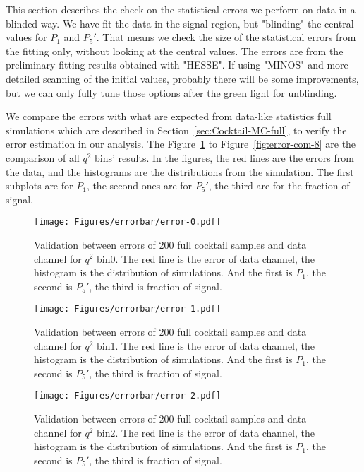 This section describes the check on the statistical errors we perform
on data in a blinded way. We have fit the data in the signal region,
but "blinding" the central values for $P_1$ and $P_5'$. That means we
check the size of the statistical errors from the fitting only,
without looking at the
central values.  The errors are from the preliminary
fitting results obtained with "HESSE".  If using "MINOS" and more
detailed scanning of the initial values, probably there will be some
improvements, but we can only fully tune those options after the green
light for unblinding.

We compare the errors with what are expected from data-like statistics
full simulations which are described in
Section~\ref{sec:Cocktail-MC-full}, to verify the error estimation in
our analysis. The Figure~\ref{fig:error-com-0} to
Figure~\ref{fig:error-com-8} are the comparison of all $q^2$ bins'
results. In the figures, the red lines are the errors from the data,
and the histograms are the distributions from the simulation. The
first subplots are for $P_1$, the second ones are for $P_5'$, the
third are for the fraction of signal.


\begin{figure}[!hbt]
  \centering
  \texttt{[image: Figures/errorbar/error-0.pdf]}
  \caption{Validation between errors of 200 full cocktail samples and
    data channel for $q^2$ bin0. The red line is the error of data
    channel, the histogram is the distribution of simulations. And the
    first is $P_1$, the second is $P_5'$, the third is fraction of
    signal.}
  \label{fig:error-com-0}
\end{figure}

\begin{figure}[!hbt]
  \centering
  \texttt{[image: Figures/errorbar/error-1.pdf]}
  \caption{Validation between errors of 200 full cocktail samples and
    data channel for $q^2$ bin1. The red line is the error of data
    channel, the histogram is the distribution of simulations. And the
    first is $P_1$, the second is $P_5'$, the third is fraction of
    signal.}
  \label{fig:error-com-1}
\end{figure}

\begin{figure}[!hbt]
  \centering
  \texttt{[image: Figures/errorbar/error-2.pdf]}
  \caption{Validation between errors of 200 full cocktail samples and
    data channel for $q^2$ bin2. The red line is the error of data
    channel, the histogram is the distribution of simulations. And the
    first is $P_1$, the second is $P_5'$, the third is fraction of
    signal.}
  \label{fig:error-com-2}
\end{figure}

